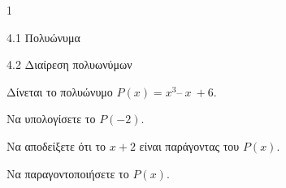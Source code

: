 \begin{ylh}{1}
\item 4.1 Πολυώνυμα
\item 4.2 Διαίρεση πολυωνύμων
\end{ylh}
Δίνεται το πολυώνυμο $P(x) = x^{3}–\ x\  + 6$.
\begin{alist}
\item Να υπολογίσετε το $P( - 2)$.
\item Να αποδείξετε ότι το $x + 2$ είναι παράγοντας του $P(x)$.
\item Να παραγοντοποιήσετε το $P(x)$.
\end{alist}

